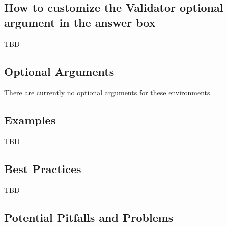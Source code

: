 \documentclass{ximera}
\begin{document}
    \subsection*{How to customize the Validator optional argument in the answer box}
        TBD
        
    \subsection*{Optional Arguments}
        There are currently no optional arguments for these environments.

    \subsection*{Examples}
    
        TBD
        
    \subsection*{Best Practices}
    
        TBD
        
    
    \subsection*{Potential Pitfalls and Problems}
    
\end{document}
